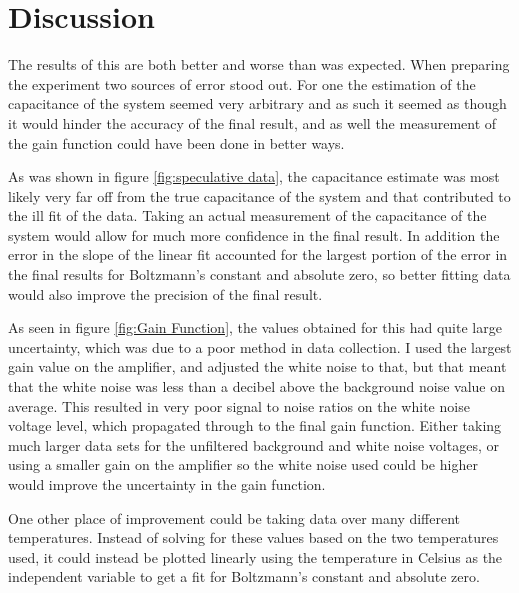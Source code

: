 \documentclass[aps,twocolumn,preprintnumbers]{revtex4}
\begin{document}
\section{Discussion}

The results of this are both better and worse than was expected. When preparing the experiment two sources of error stood out. For one the estimation of the capacitance of the system seemed very arbitrary and as such it seemed as though it would hinder the accuracy of the final result, and as well the measurement of the gain function could have been done in better ways. 

As was shown in figure \ref{fig:speculative data}, the capacitance estimate was most likely very far off from the true capacitance of the system and that contributed to the ill fit of the data. Taking an actual measurement of the capacitance of the system would allow for much more confidence in the final result. In addition the error in the slope of the linear fit accounted for the largest portion of the error in the final results for Boltzmann's constant and absolute zero, so better fitting data would also improve the precision of the final result. 

As seen in figure \ref{fig:Gain Function}, the values obtained for this had quite large uncertainty, which was due to a poor method in data collection. I used the largest gain value on the amplifier, and adjusted the white noise to that, but that meant that the white noise was less than a decibel above the background noise value on average. This resulted in very poor signal to noise ratios on the white noise voltage level, which propagated through to the final gain function. Either taking much larger data sets for the unfiltered background and white noise voltages, or using a smaller gain on the amplifier so the white noise used could be higher would improve the uncertainty in the gain function. 

One other place of improvement could be taking data over many different temperatures. Instead of solving for these values based on the two temperatures used, it could instead be plotted linearly using the temperature in Celsius as the independent variable to get a fit for Boltzmann's constant and absolute zero. 
\end{document}
